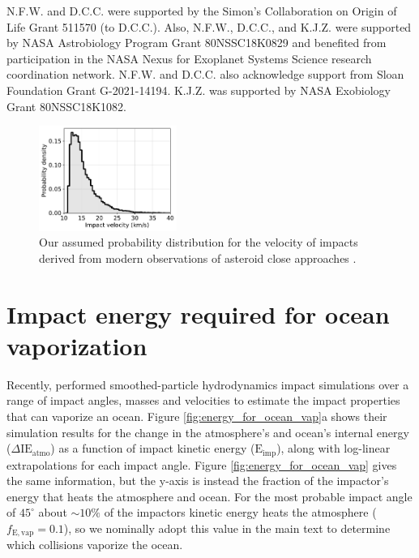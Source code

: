 \documentclass[preprint]{aastex63}
\begin{document}
N.F.W. and D.C.C. were supported by the Simon's Collaboration on Origin of Life Grant 511570 (to D.C.C.). Also, N.F.W., D.C.C., and K.J.Z. were supported by NASA Astrobiology Program Grant 80NSSC18K0829 and benefited from participation in the NASA Nexus for Exoplanet Systems Science research coordination network. N.F.W. and D.C.C. also acknowledge support from Sloan Foundation Grant G-2021-14194. K.J.Z. was supported by NASA Exobiology Grant 80NSSC18K1082.

\appendix

\renewcommand{\thefigure}{A\arabic{figure}}
\renewcommand{\thetable}{A\arabic{table}}
\setcounter{figure}{0}
\setcounter{table}{0}

\begin{figure}
  \centering
  \includegraphics[width=0.4\textwidth]{figures/velocity_distribution.pdf}
  \caption{Our assumed probability distribution for the velocity of impacts derived from modern observations of asteroid close approaches \citep{Park_2023}.}
  \label{fig:velocity_distribution}
\end{figure}

\section{Impact energy required for ocean vaporization} \label{sec:append_vap}

Recently, \citet{Citron_2022} performed smoothed-particle hydrodynamics impact simulations over a range of impact angles, masses and velocities to estimate the impact properties that can vaporize an ocean. Figure \ref{fig:energy_for_ocean_vap}a shows their simulation results for the change in the atmosphere's and ocean's internal energy ($\Delta \mathrm{IE}_\mathrm{atmo}$) as a function of impact kinetic energy ($\mathrm{E}_\mathrm{imp}$), along with log-linear extrapolations for each impact angle. Figure \ref{fig:energy_for_ocean_vap} gives the same information, but the y-axis is instead the fraction of the impactor's energy that heats the atmosphere and ocean. For the most probable impact angle of $45^\circ$ about $\sim 10\%$ of the impactors kinetic energy heats the atmosphere ($f_\mathrm{E,vap} = 0.1$), so we nominally adopt this value in the main text to determine which collisions vaporize the ocean.
\end{document}
